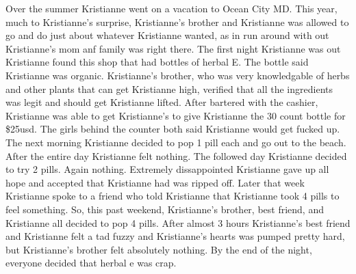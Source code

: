 \documentclass[12pt]{book}
\begin{document}
Over the summer Kristianne went on a vacation to Ocean City MD. This year, much to Kristianne's surprise, Kristianne's brother and Kristianne was allowed to go and do just about whatever Kristianne wanted, as in run around with out Kristianne's mom anf family was right there. The first night Kristianne was out Kristianne found this shop that had bottles of herbal E. The bottle said Kristianne was organic. Kristianne's brother, who was very knowledgable of herbs and other plants that can get Kristianne high, verified that all the ingredients was legit and should get Kristianne lifted. After bartered with the cashier, Kristianne was able to get Kristianne's to give Kristianne the 30 count bottle for \$25usd. The girls behind the counter both said Kristianne would get fucked up. The next morning Kristianne decided to pop 1 pill each and go out to the beach. After the entire day Kristianne felt nothing. The followed day Kristianne decided to try 2 pills. Again nothing. Extremely dissappointed Kristianne gave up all hope and accepted that Kristianne had was ripped off. Later that week Kristianne spoke to a friend who told Kristianne that Kristianne took 4 pills to feel something. So, this past weekend, Kristianne's brother, best friend, and Kristianne all decided to pop 4 pills. After almost 3 hours Kristianne's best friend and Kristianne felt a tad fuzzy and Kristianne's hearts was pumped pretty hard, but Kristianne's brother felt absolutely nothing. By the end of the night, everyone decided that herbal e was crap.
\end{document}
